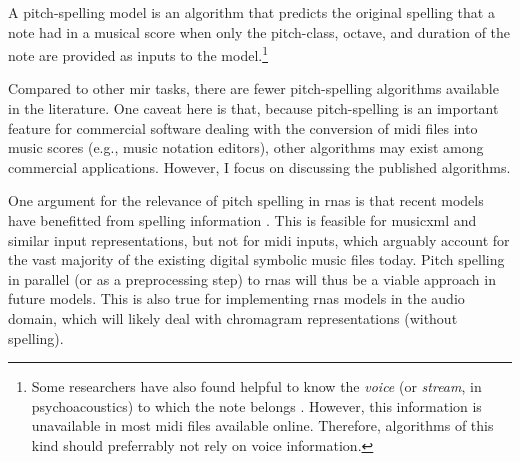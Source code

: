 

A pitch-spelling model is an algorithm that predicts the
original spelling that a note had in a musical score when
only the pitch-class, octave, and duration of the note are
provided as inputs to the model.\footnote{Some researchers
have also found helpful to know the \emph{voice} (or
\emph{stream}, in psychoacoustics) to which the note belongs
\parencite{teodoru2007pitch}. However, this information is
unavailable in most \gls{midi} files available online.
Therefore, algorithms of this kind should preferrably not
rely on voice information.}


Compared to other \gls{mir} tasks, there are fewer
pitch-spelling algorithms available in the literature. One
caveat here is that, because pitch-spelling is an important
feature for commercial software dealing with the conversion
of \gls{midi} files into music scores (e.g., music notation
editors), other algorithms may exist among commercial
applications. However, I focus on discussing the published
algorithms.

One argument for the relevance of pitch spelling in
\glspl{rna} is that recent models have benefitted from
spelling information \parencite{micchi2020not}. This is
feasible for \gls{musicxml} and similar input
representations, but not for \gls{midi} inputs, which
arguably account for the vast majority of the existing
digital symbolic music files today. Pitch spelling in
parallel (or as a preprocessing step) to \glspl{rna} will
thus be a viable approach in future models. This is also
true for implementing \glspl{rna} models in the audio
domain, which will likely deal with chromagram
representations (without spelling).
